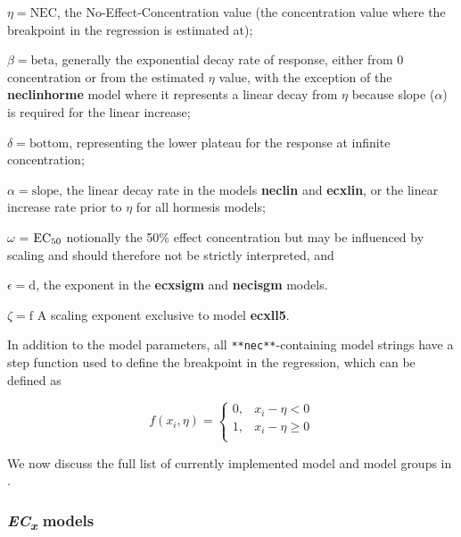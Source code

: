 \(\eta = \text{NEC}\), the No-Effect-Concentration value (the
concentration value where the breakpoint in the regression is estimated
at);

\(\beta = \text{beta}\), generally the exponential decay rate of
response, either from 0 concentration or from the estimated \(\eta\)
value, with the exception of the \textbf{neclinhorme} model where it
represents a linear decay from \(\eta\) because slope (\(\alpha\)) is
required for the linear increase;

\(\delta = \text{bottom}\), representing the lower plateau for the
response at infinite concentration;

\(\alpha = \text{slope}\), the linear decay rate in the models
\textbf{neclin} and \textbf{ecxlin}, or the linear increase rate prior
to \(\eta\) for all hormesis models;

\(\omega\) = \(\text{EC\textsubscript{50}}\) notionally the 50\% effect
concentration but may be influenced by scaling and should therefore not
be strictly interpreted, and

\(\epsilon = \text{d}\), the exponent in the \textbf{ecxsigm} and
\textbf{necisgm} models.

\(\zeta = \text{f}\) A scaling exponent exclusive to model
\textbf{ecxll5}.

In addition to the model parameters, all \texttt{**nec**}-containing
model strings have a step function used to define the breakpoint in the
regression, which can be defined as

\[
f(x_i, \eta) = \begin{cases} 
      0, & x_i - \eta < 0 \\
      1, & x_i - \eta \geq 0 \\
   \end{cases}
\]

We now discuss the full list of currently implemented model and model
groups in .

\newpage

\hypertarget{ecx-models}{%
\subsubsection{\texorpdfstring{\emph{EC\textsubscript{x}}
models}{ECx models}}\label{ecx-models}}

